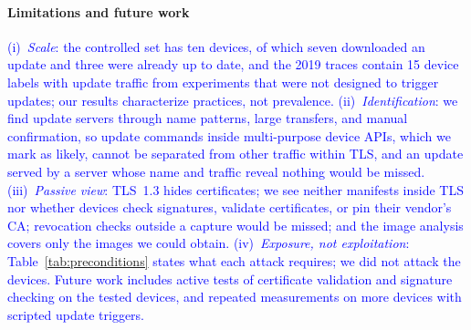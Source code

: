 \paragraph{Limitations and future work}
\textcolor{blue}{(i)~\emph{Scale}: the controlled set has ten devices, of which seven downloaded an update and three were already up to date, and the 2019 traces contain 15 device labels with update traffic from experiments that were not designed to trigger updates; our results characterize practices, not prevalence.
(ii)~\emph{Identification}: we find update servers through name patterns, large transfers, and manual confirmation, so update commands inside multi-purpose device APIs, which we mark as likely, cannot be separated from other traffic within TLS, and an update served by a server whose name and traffic reveal nothing would be missed.
(iii)~\emph{Passive view}: TLS~1.3 hides certificates; we see neither manifests inside TLS nor whether devices check signatures, validate certificates, or pin their vendor's CA; revocation checks outside a capture would be missed; and the image analysis covers only the images we could obtain.
(iv)~\emph{Exposure, not exploitation}: Table~\ref{tab:preconditions} states what each attack requires; we did not attack the devices.
Future work includes active tests of certificate validation and signature checking on the tested devices, and repeated measurements on more devices with scripted update triggers.}
